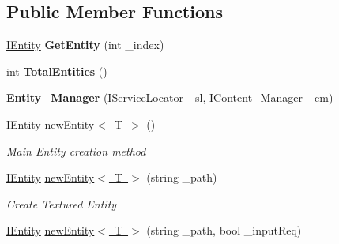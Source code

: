 \subsection*{Public Member Functions}
\begin{DoxyCompactItemize}
\item 
\mbox{\label{class_g_m_t_b_1_1_managers_1_1_entity___manager_a9203b59e57355460b8a0de499b68b668}} 
\mbox{\hyperlink{interface_g_m_t_b_1_1_interfaces_1_1_i_entity}{I\+Entity}} {\bfseries Get\+Entity} (int \+\_\+index)
\item 
\mbox{\label{class_g_m_t_b_1_1_managers_1_1_entity___manager_a62926f9bc4730b167d3f22d1acf9dcc8}} 
int {\bfseries Total\+Entities} ()
\item 
\mbox{\label{class_g_m_t_b_1_1_managers_1_1_entity___manager_a690275ff3e8793641778cd1df808f678}} 
{\bfseries Entity\+\_\+\+Manager} (\mbox{\hyperlink{interface_g_m_t_b_1_1_interfaces_1_1_i_service_locator}{I\+Service\+Locator}} \+\_\+sl, \mbox{\hyperlink{interface_g_m_t_b_1_1_interfaces_1_1_i_content___manager}{I\+Content\+\_\+\+Manager}} \+\_\+cm)
\item 
\mbox{\hyperlink{interface_g_m_t_b_1_1_interfaces_1_1_i_entity}{I\+Entity}} \mbox{\hyperlink{class_g_m_t_b_1_1_managers_1_1_entity___manager_a996b960a3e3755a9e2a90501aa961715}{new\+Entity$<$ T $>$}} ()
\begin{DoxyCompactList}\small\item\em Main Entity creation method \end{DoxyCompactList}\item 
\mbox{\hyperlink{interface_g_m_t_b_1_1_interfaces_1_1_i_entity}{I\+Entity}} \mbox{\hyperlink{class_g_m_t_b_1_1_managers_1_1_entity___manager_a3898b03d89ea4b3c735866bbe81040b9}{new\+Entity$<$ T $>$}} (string \+\_\+path)
\begin{DoxyCompactList}\small\item\em Create Textured Entity \end{DoxyCompactList}\item 
\mbox{\hyperlink{interface_g_m_t_b_1_1_interfaces_1_1_i_entity}{I\+Entity}} \mbox{\hyperlink{class_g_m_t_b_1_1_managers_1_1_entity___manager_a994d6ed32e14c2deb0b11a95e1edba7a}{new\+Entity$<$ T $>$}} (string \+\_\+path, bool \+\_\+input\+Req)

\end{DoxyCompactItemize}
